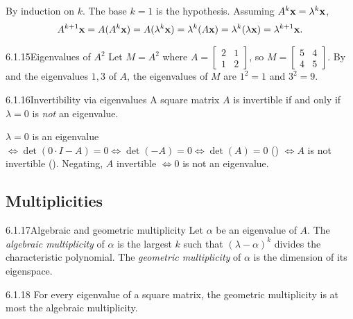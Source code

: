 \begin{prf}
By induction on $k$. The base $k=1$ is the hypothesis. Assuming $A^k\mathbf{x}=\lambda^k\mathbf{x}$,
\[
A^{k+1}\mathbf{x}=A(A^k\mathbf{x})=A(\lambda^k\mathbf{x})=\lambda^k(A\mathbf{x})=\lambda^k(\lambda\mathbf{x})=\lambda^{k+1}\mathbf{x}.
\]
\end{prf}

\begin{exmp}{6.1.15}{Eigenvalues of $A^2$}
Let $M=A^2$ where $A=\left[\begin{smallmatrix}2&1\\1&2\end{smallmatrix}\right]$, so $M=\left[\begin{smallmatrix}5&4\\4&5\end{smallmatrix}\right]$. By  and the eigenvalues $1,3$ of $A$, the eigenvalues of $M$ are $1^2=1$ and $3^2=9$.
\end{exmp}

\begin{thms}{6.1.16}{Invertibility via eigenvalues}
A square matrix $A$ is invertible if and only if $\lambda=0$ is \emph{not} an eigenvalue.
\end{thms}

\begin{prf}
$\lambda=0$ is an eigenvalue $\iff\det(0\cdot I-A)=0\iff\det(-A)=0\iff\det(A)=0$ () $\iff A$ is not invertible (). Negating, $A$ invertible $\iff0$ is not an eigenvalue.
\end{prf}

\subsection{Multiplicities}

\begin{defns}{6.1.17}{Algebraic and geometric multiplicity}
Let $\alpha$ be an eigenvalue of $A$. The \emph{algebraic multiplicity} of $\alpha$ is the largest $k$ such that $(\lambda-\alpha)^k$ divides the characteristic polynomial. The \emph{geometric multiplicity} of $\alpha$ is the dimension of its eigenspace.
\end{defns}

\begin{thms}{6.1.18}{}
For every eigenvalue of a square matrix, the geometric multiplicity is at most the algebraic multiplicity.
\end{thms}

